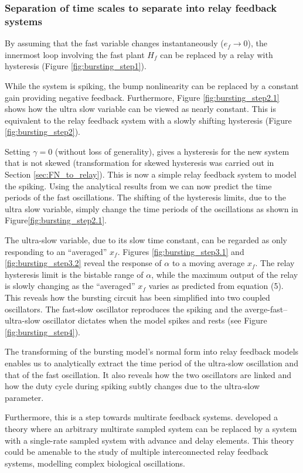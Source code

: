 \documentclass[a4paper, 12pt]{article}
\begin{document}
\newpage
\subsubsection{Separation of time scales to separate into relay feedback systems}
By assuming that the fast variable changes instantaneously ($e_f\rightarrow0$), the innermost loop involving the fast plant $H_f$ can be replaced by a relay with hysteresis (Figure \ref{fig:bursting_step1}). 

While the system is spiking, the bump nonlinearity can be replaced by a constant gain providing negative feedback. Furthermore, Figure \ref{fig:bursting_step2.1} shows how the ultra slow variable can be viewed as nearly constant. This is equivalent to the relay feedback system with a slowly shifting hysteresis (Figure \ref{fig:bursting_step2}). 

Setting $\gamma = 0$ (without loss of generality), gives a hysteresis for the new system that is not skewed (transformation for skewed hysteresis was carried out in Section \ref{sec:FN_to_relay}). This is now a simple relay feedback system to model the spiking. Using the analytical results from \cite{astrom1995} we can now predict the time periods of the fast oscillations. The shifting of the hysteresis limits, due to the ultra slow variable, simply change the time periods of the oscillations as shown in Figure\ref{fig:bursting_step2.1}.

The ultra-slow variable, due to its slow time constant, can be regarded as only responding to an ``averaged'' $x_f$. Figures \ref{fig:bursting_step3.1} and \ref{fig:bursting_step3.2} reveal the response of $\alpha$ to a moving average $x_f$. The relay hysteresis limit is the bistable range of $\alpha$, while the maximum output of the relay is slowly changing as the ``averaged'' $x_f$ varies as predicted from equation (5). This reveals how the bursting circuit has been simplified into two coupled oscillators. The fast-slow oscillator reproduces the spiking and the averge-fast--ultra-slow oscillator dictates when the model spikes and rests (see Figure \ref{fig:bursting_step4}). 

The transforming of the bursting model's normal form into relay feedback models enables us to analytically extract the time period of the ultra-slow oscillation and that of the fast oscillation. It also reveals how the two oscillators are linked and how the duty cycle during spiking subtly changes due to the ultra-slow parameter. 

Furthermore, this is a step towards multirate feedback systems. \cite{kranc} developed a theory where an arbitrary multirate sampled system can be replaced by a system with a single-rate sampled system with advance and delay elements. This theory could be amenable to the study of multiple interconnected relay feedback systems, modelling complex biological oscillations. 
\end{document}

